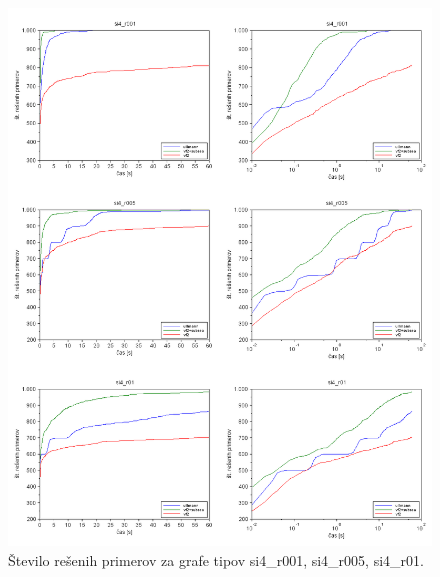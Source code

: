 \documentclass[a4paper, 12pt, ]{book}
\begin{document}
\begin{figure}
\begin{center}
\includegraphics[width=15cm]{img/results_si4.png}
\end{center}
\caption{Število rešenih primerov za grafe tipov si4\_r001, si4\_r005, si4\_r01.}
\label{pic_res_si4}
\end{figure}
\end{document}
